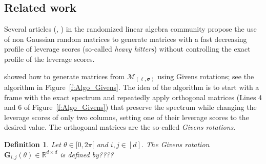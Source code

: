 \documentclass[twoside,11pt]{book}
\newtheorem{definition}{Definition}
\numberwithin{theorem}{chapter}
\numberwithin{definition}{chapter}
\numberwithin{proposition}{chapter}
\numberwithin{corollary}{chapter}
\numberwithin{example}{chapter}
\numberwithin{lemma}{chapter}
\begin{document}
\subsection{Related work}

Several articles (\citealp{RaMa14}, \citealp{MaMaYu14}) in the randomized linear algebra community propose the use of non Gaussian random matrices to generate matrices with a fast decreasing profile of leverage scores (so-called \emph{heavy hitters}) without controlling the exact profile of the leverage scores.

\cite{DhHeSuTr05} showed how to generate matrices from $\mathcal{M}_{(\bm{\ell},\bm{\sigma})}$ using Givens rotations; see the algorithm in Figure~\ref{f:Algo_Givens}. The idea of the algorithm is to start with a frame with the exact spectrum and repeatedly apply orthogonal matrices (Lines 4 and 6 of Figure~\ref{f:Algo_Givens}) that preserve the spectrum while changing the leverage scores of only two columns, setting one of their leverage scores to the desired value. The orthogonal matrices are the so-called \emph{Givens rotations}.
\begin{definition}
Let $\theta \in [0, 2\pi[$ and $i,j \in [d]$. The Givens rotation $\bm{G}_{i,j}(\theta) \in \mathbb{R}^{d \times d}$ is defined by????

\end{definition}
\end{document}
